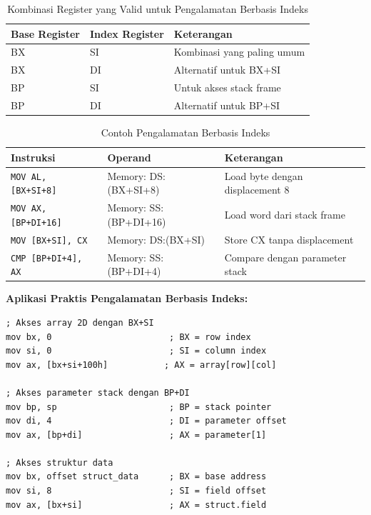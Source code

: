 \begin{table}[h]
\centering
\caption{Kombinasi Register yang Valid untuk Pengalamatan Berbasis Indeks}
\begin{tabular}{|p{3cm}|p{3cm}|p{9cm}|}
\hline
\textbf{Base Register} & \textbf{Index Register} & \textbf{Keterangan} \\
\hline
BX & SI & Kombinasi yang paling umum \\
\hline
BX & DI & Alternatif untuk BX+SI \\
\hline
BP & SI & Untuk akses stack frame \\
\hline
BP & DI & Alternatif untuk BP+SI \\
\hline
\end{tabular}
\label{tab:indexed-addressing-combinations}
\end{table}

\begin{table}[h]
\centering
\caption{Contoh Pengalamatan Berbasis Indeks}
\begin{tabular}{|p{4cm}|p{4cm}|p{7cm}|}
\hline
\textbf{Instruksi} & \textbf{Operand} & \textbf{Keterangan} \\
\hline
\texttt{MOV AL, [BX+SI+8]} & Memory: DS:(BX+SI+8) & Load byte dengan displacement 8 \\
\hline
\texttt{MOV AX, [BP+DI+16]} & Memory: SS:(BP+DI+16) & Load word dari stack frame \\
\hline
\texttt{MOV [BX+SI], CX} & Memory: DS:(BX+SI) & Store CX tanpa displacement \\
\hline
\texttt{CMP [BP+DI+4], AX} & Memory: SS:(BP+DI+4) & Compare dengan parameter stack \\
\hline
\end{tabular}
\label{tab:indexed-addressing-examples}
\end{table}

\textbf{Aplikasi Praktis Pengalamatan Berbasis Indeks:}
\begin{lstlisting}[language={[x86masm]Assembler}, caption=Aplikasi Praktis Pengalamatan Berbasis Indeks, label=lst:indexed-applications]
; Akses array 2D dengan BX+SI
mov bx, 0                       ; BX = row index
mov si, 0                       ; SI = column index
mov ax, [bx+si+100h]           ; AX = array[row][col]

; Akses parameter stack dengan BP+DI
mov bp, sp                      ; BP = stack pointer
mov di, 4                       ; DI = parameter offset
mov ax, [bp+di]                 ; AX = parameter[1]

; Akses struktur data
mov bx, offset struct_data      ; BX = base address
mov si, 8                       ; SI = field offset
mov ax, [bx+si]                 ; AX = struct.field
\end{lstlisting}

